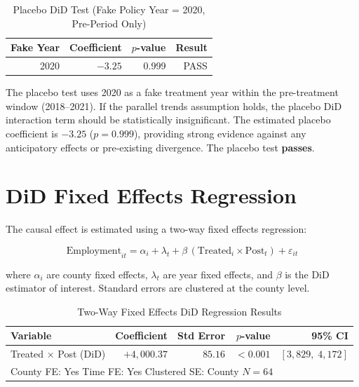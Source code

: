 \documentclass[12pt]{article}
\begin{document}
\begin{table}[H]
\centering
\caption{Placebo DiD Test (Fake Policy Year = 2020, Pre-Period Only)}
\label{tab:placebo}
\begin{tabular}{rrrr}
\toprule
\textbf{Fake Year} & \textbf{Coefficient} & \textbf{$p$-value} & \textbf{Result} \\
\midrule
2020 & $-3.25$ & 0.999 & PASS \\
\bottomrule
\end{tabular}
\end{table}

The placebo test uses 2020 as a fake treatment year within the pre-treatment window
(2018--2021). If the parallel trends assumption holds, the placebo DiD interaction term
should be statistically insignificant. The estimated placebo coefficient is $-3.25$
($p = 0.999$), providing strong evidence against any anticipatory effects or pre-existing
divergence. The placebo test \textbf{passes}.

\section{DiD Fixed Effects Regression}

The causal effect is estimated using a two-way fixed effects regression:

\[
\text{Employment}_{it} = \alpha_i + \lambda_t + \beta\,(\text{Treated}_i \times \text{Post}_{t}) + \varepsilon_{it}
\]

where $\alpha_i$ are county fixed effects, $\lambda_t$ are year fixed effects, and
$\beta$ is the DiD estimator of interest. Standard errors are clustered at the county level.

\begin{table}[H]
\centering
\caption{Two-Way Fixed Effects DiD Regression Results}
\label{tab:did}
\begin{tabular}{lrrrr}
\toprule
\textbf{Variable} & \textbf{Coefficient} & \textbf{Std Error}
    & \textbf{$p$-value} & \textbf{95\% CI} \\
\midrule
Treated $\times$ Post (DiD) & $+4{,}000.37$ & $85.16$ & $<0.001$ & $[3{,}829,\; 4{,}172]$ \\
\midrule
\multicolumn{5}{l}{\footnotesize County FE: Yes \quad Time FE: Yes \quad Clustered SE: County \quad $N=64$} \\
\bottomrule
\end{tabular}
\end{table}
\end{document}
